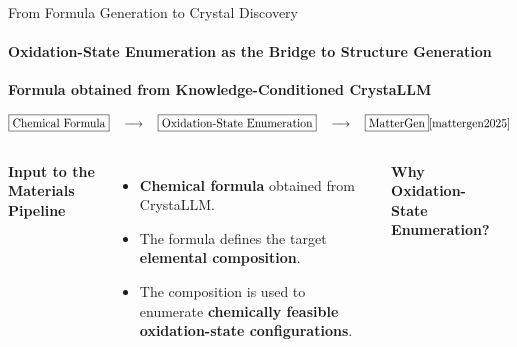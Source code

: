 \documentclass[aspectratio=169, 11pt]{beamer}
\begin{document}
\begin{frame}{From Formula Generation to Crystal Discovery}
    \framesubtitle{Oxidation-State Enumeration as the Bridge to Structure Generation}

    \begin{center}
        \textbf{\large Formula obtained from Knowledge-Conditioned CrystaLLM}

        \vspace{0.10cm}

        \[
        \boxed{\text{Chemical Formula}}
        \quad\longrightarrow\quad
        \boxed{\text{Oxidation-State Enumeration}}
        \quad\longrightarrow\quad
        \boxed{\text{MatterGen}} \cite{mattergen2025}
        \]
    \end{center}

    \vspace{0.02cm}

    \begin{columns}[T]


        \textbf{\large Input to the Materials Pipeline}

        \vspace{0.03cm}

        {\small
        \begin{itemize}
            \setlength{\itemsep}{3pt}
            \setlength{\parskip}{0pt}

            \item
            \textbf{Chemical formula} obtained from CrystaLLM.

            \item The formula defines the target
            \textbf{elemental composition}.

            \item The composition is used to enumerate
            \textbf{chemically feasible oxidation-state configurations}.
        \end{itemize}
        }


        \textbf{\large Why Oxidation-State Enumeration?}

        \vspace{0.03cm}

        {\small
        \begin{itemize}
            \setlength{\itemsep}{3pt}
            \setlength{\parskip}{0pt}


\end{itemize}}
\end{columns}
\end{frame}
\end{document}
